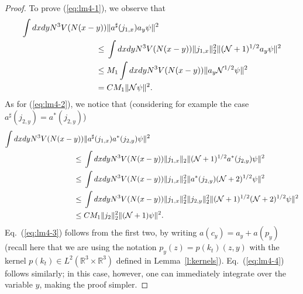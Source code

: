 \documentclass[11pt,a4paper]{article}
\newcommand{\bR}{{\mathbb R}}
\newcommand{\cN}{{\cal N}}
\begin{document}
\begin{proof}
To prove (\ref{eq:lm4-1}), we observe that
\[ \begin{split} \int dx dy N^3 V (N (x-y)) & \| a^\sharp (j_{1,x}) a_y \psi \|^2 \\ \leq \; & \int dx dy N^3 V (N (x-y)) \| j_{1,x} \|_2^2 \| (\cN+1)^{1/2} a_y \psi \|^2 \\ \leq \; & M_1 \int dx dy N^3 V (N (x-y)) \| a_y \cN^{1/2} \psi \|^2 \\ = \; &C M_1 \| \cN \psi \|^2. \end{split} \]
As for (\ref{eq:lm4-2}), we notice that (considering for example the case $a^\sharp (j_{2,y}) = a^* (j_{2,y})$) 
\[ \begin{split} 
\int dx dy N^3 V(N (x-y)) & \| a^\sharp (j_{1,x}) a^* (j_{2,y}) \psi \|^2 \\ \leq \; & \int dx dy N^3 V (N (x-y)) \| j_{1,x} \|_2 \| (\cN+1)^{1/2} a^* (j_{2,y}) \psi \|^2 \\ \leq \; & \int dx dy N^3 V (N (x-y)) \| j_{1,x} \|^2_2 \| a^* (j_{2,y}) (\cN+2)^{1/2} \psi \|^2  \\ \leq \; & \int dx dy N^3 V (N (x-y)) \| j_{1,x} \|^2_2  \| j_{2,y} \|_2^2 \| (\cN+1)^{1/2} (\cN+2)^{1/2} \psi \|^2 \\ \leq \; & C M_1 \| j_2 \|^2_{2} \| (\cN+1) \psi \|^2.  \end{split} \]
Eq.\ (\ref{eq:lm4-3}) follows from the first two, by writing $a (c_y) = a_y + a (p_y)$ (recall here that we are using the notation $p_y (z) = p (k_t) (z,y)$ with the kernel $p (k_t) \in L^2 (\bR^3 \times \bR^3)$ defined in Lemma~\ref{l:kernels}). Eq.\ (\ref{eq:lm4-4}) follows similarly; in this case, however, one can immediately integrate over the variable $y$, making the proof simpler. 
\end{proof}
\end{document}

